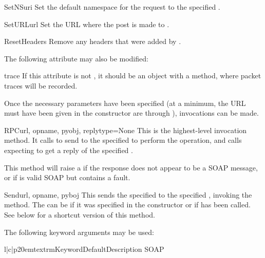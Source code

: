 \begin{methoddesc}{SetNS}{uri}
Set the default namespace for the request to the specified .
\end{methoddesc}

\begin{methoddesc}{SetURL}{url}
Set the URL where the post is made to .
\end{methoddesc}

\begin{methoddesc}{ResetHeaders}{}
Remove any headers that were added by .
\end{methoddesc}

The following attribute may also be modified:

\begin{memberdesc}{trace}
If this attribute is not , it should be an object with a
 method, where packet traces will be recorded.
\end{memberdesc}

Once the necessary parameters have been specified (at a minimum, the URL
must have been given in the constructor are through ),
invocations can be made.

\begin{methoddesc}{RPC}{url, opname, pyobj, replytype=None}
This is the highest-level invocation method.
It calls  to send  to the specified 
to perform the  operation,
and calls  expecting to get a reply of the specified
.

This method will raise a  if the response does not
appear to be a SOAP message, or if is valid SOAP but contains a fault.
\end{methoddesc}

\begin{methoddesc}{Send}{url, opname, pyboj}
This sends the specified  to the specified , invoking
the  method.
The  can be  if it was specified in the 
constructor or if  has been called.
See below for a shortcut version of this method.

The following keyword arguments may be used:

\begin{tableiii}{l|c|p{20em}}{textrm}{Keyword}{Default}{Description}
    SOAP 
\end{tableiii}

\end{methoddesc}

